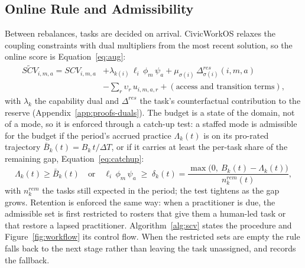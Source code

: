 \documentclass[utf8]{FrontiersinHarvard}
\begin{document}
	\subsection{Online Rule and Admissibility}
	\label{sec:online}

	Between rebalances, tasks are decided on arrival. CivicWorkOS relaxes the coupling constraints with dual multipliers from the most recent solution, so the online score is Equation~\eqref{eq:aug}:
	\begin{equation}
		\begin{split}
			\widetilde{SCV}_{i,m,a} = SCV_{i,m,a}
			&+ \lambda_{k(i)}\,\ell_i\,\phi_m\,\psi_a
			+ \mu_{\sigma(i)}\,\Delta^{res}_{\sigma(i)}(i,m,a)\\
			&- \sum_{r}\upsilon_r\,u_{i,m,a,r} + (\text{access and transition terms}),
		\end{split}
		\label{eq:aug}
	\end{equation}
	with $\lambda_k$ the capability dual and $\Delta^{res}$ the task's counterfactual contribution to the reserve (Appendix~\ref{app:proofs-duals}). The budget is a state of the domain, not of a mode, so it is enforced through a catch-up test: a staffed mode is admissible for the budget if the period's accrued practice $\Lambda_k(t)$ is on its pro-rated trajectory $\bar B_k(t)=B_k\,t/\Delta T$, or if it carries at least the per-task share of the remaining gap, Equation~\eqref{eq:catchup}:
	\begin{equation}
		\Lambda_k(t) \ge \bar B_k(t) \quad\text{or}\quad \ell_i\,\phi_m\,\psi_a \;\ge\; \delta_k(t) = \frac{\max\bigl(0,\ B_k(t)-\Lambda_k(t)\bigr)}{n^{rem}_k(t)},
		\label{eq:catchup}
	\end{equation}
	with $n^{rem}_k$ the tasks still expected in the period; the test tightens as the gap grows. Retention is enforced the same way: when a practitioner is due, the admissible set is first restricted to rosters that give them a human-led task or that restore a lapsed practitioner. Algorithm~\ref{alg:scv} states the procedure and Figure~\ref{fig:workflow} its control flow. When the restricted sets are empty the rule falls back to the next stage rather than leaving the task unassigned, and records the fallback.
\end{document}
